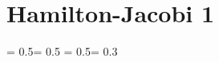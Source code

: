 \chapter{Hamilton-Jacobi 1}



\sloppy

\thinmuskip = 0.5\thinmuskip \medmuskip = 0.5\medmuskip
\thickmuskip = 0.5\thickmuskip \arraycolsep = 0.3\arraycolsep

\renewcommand{\theequation}{\arabic{section}.\arabic{equation}}

\def\open#1{\setbox0=\hbox{$#1$}
\baselineskip = 0pt \vbox{\hbox{\hspace*{0.4 \wd0}\tiny
$\circ$}\hbox{$#1$}} \baselineskip = 10pt\!}





